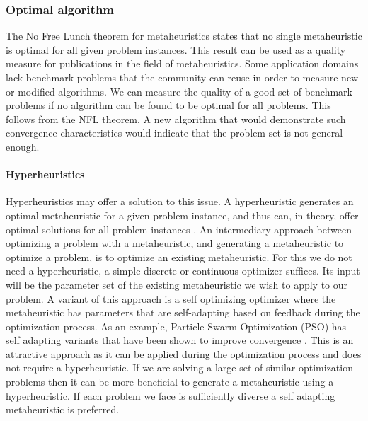 \subsubsection{Optimal algorithm}
The No Free Lunch theorem for metaheuristics \cite{NFL} states that no single metaheuristic is optimal for all given problem instances. 
This result can be used as a quality measure for publications in the field of metaheuristics. Some application domains lack benchmark problems that the community can reuse in order to measure new or modified algorithms. 
We can measure the quality of a good set of benchmark problems if no algorithm can be found to be optimal for all problems. This follows from the NFL theorem. A new algorithm that would demonstrate such convergence characteristics would indicate that the problem set is not general enough.

\paragraph{Hyperheuristics}
Hyperheuristics may offer a solution to this issue. A hyperheuristic generates an optimal metaheuristic for a given problem instance, and thus can, in theory, offer optimal solutions for all problem instances \cite{HyperNFL}.
An intermediary approach between optimizing a problem with a metaheuristic, and generating a metaheuristic to optimize a problem, is to optimize an existing metaheuristic. For this we do not need a hyperheuristic, a simple discrete or continuous optimizer suffices. Its input will be the parameter set of the existing metaheuristic we wish to apply to our problem. A variant of this approach is a self optimizing optimizer where the metaheuristic has parameters that are self-adapting based on feedback during the optimization process. As an example, Particle Swarm Optimization (PSO) \cite{PSO} has self adapting variants that have been shown to improve convergence \cite{PSOInertiaShi}. This is an attractive approach as it can be applied during the optimization process and does not require a hyperheuristic. If we are solving a large set of similar optimization problems then it can be more beneficial to generate a metaheuristic using a hyperheuristic. If each problem we face is sufficiently diverse a self adapting metaheuristic is preferred. 

